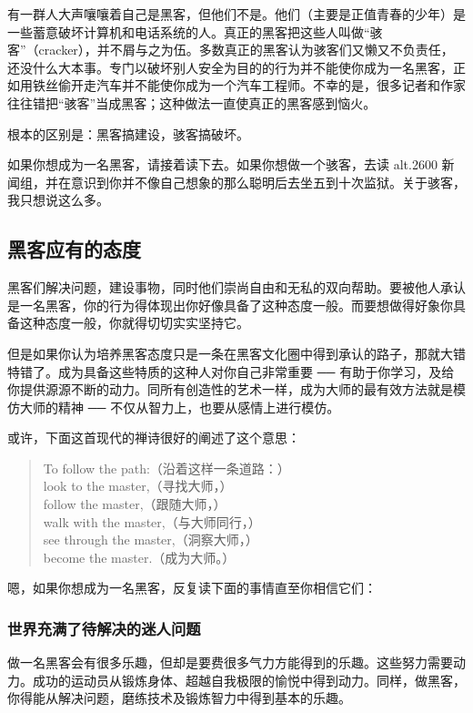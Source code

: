 有一群人大声嚷嚷着自己是黑客，但他们不是。他们（主要是正值青春的少年）是一些蓄意破坏计算机和电话系统的人。真正的黑客把这些人叫做“骇客”（cracker），并不屑与之为伍。多数真正的黑客认为骇客们又懒又不负责任，还没什么大本事。专门以破坏别人安全为目的的行为并不能使你成为一名黑客，正如用铁丝偷开走汽车并不能使你成为一个汽车工程师。不幸的是，很多记者和作家往往错把“骇客”当成黑客；这种做法一直使真正的黑客感到恼火。

根本的区别是：黑客搞建设，骇客搞破坏。

如果你想成为一名黑客，请接着读下去。如果你想做一个骇客，去读 alt.2600 新闻组，并在意识到你并不像自己想象的那么聪明后去坐五到十次监狱。关于骇客，我只想说这么多。


\subsection{黑客应有的态度}
黑客们解决问题，建设事物，同时他们崇尚自由和无私的双向帮助。要被他人承认是一名黑客，你的行为得体现出你好像具备了这种态度一般。而要想做得好象你具备这种态度一般，你就得切切实实坚持它。

但是如果你认为培养黑客态度只是一条在黑客文化圈中得到承认的路子，那就大错特错了。成为具备这些特质的这种人对你自己非常重要 ── 有助于你学习，及给你提供源源不断的动力。同所有创造性的艺术一样，成为大师的最有效方法就是模仿大师的精神 ── 不仅从智力上，也要从感情上进行模仿。

或许，下面这首现代的禅诗很好的阐述了这个意思：

\begin{verse}
    To follow the path:（沿着这样一条道路：）\\
    look to the master,（寻找大师，）\\
    follow the master,（跟随大师，）\\
    walk with the master,（与大师同行，）\\
    see through the master,（洞察大师，）\\
    become the master.（成为大师。）
\end{verse}

嗯，如果你想成为一名黑客，反复读下面的事情直至你相信它们：


\subsubsection{世界充满了待解决的迷人问题}
做一名黑客会有很多乐趣，但却是要费很多气力方能得到的乐趣。这些努力需要动力。成功的运动员从锻炼身体、超越自我极限的愉悦中得到动力。同样，做黑客，你得能从解决问题，磨练技术及锻炼智力中得到基本的乐趣。

